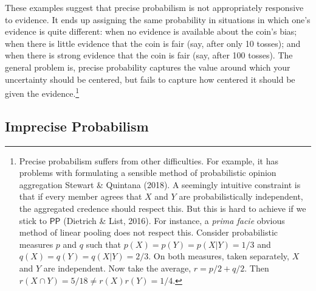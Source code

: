 \documentclass[
  10pt,
  dvipsnames,enabledeprecatedfontcommands]{scrartcl}
\newcommand{\s}[1]{\mbox{$\mathsf{#1}$}}
\begin{document}
These examples suggest that precise probabilism is not appropriately
responsive to evidence. It ends up assigning the same probability in
situations in which one's evidence is quite different: when no evidence
is available about the coin's bias; when there is little evidence that
the coin is fair (say, after only 10 tosses); and when there is strong
evidence that the coin is fair (say, after 100 tosses). The general
problem is, precise probability captures the value around which your
uncertainty should be centered, but fails to capture how centered it
should be given the evidence.\footnote{Precise probabilism suffers from
  other difficulties. For example, it has problems with formulating a
  sensible method of probabilistic opinion aggregation Stewart \&
  Quintana (2018). A seemingly intuitive constraint is that if every
  member agrees that \(X\) and \(Y\) are probabilistically independent,
  the aggregated credence should respect this. But this is hard to
  achieve if we stick to \s{PP} (Dietrich \& List, 2016). For instance,
  a \emph{prima facie} obvious method of linear pooling does not respect
  this. Consider probabilistic measures \(p\) and \(q\) such that
  \(p(X) = p(Y) = p(X\vert Y) = 1/3\) and
  \(q(X) = q(Y) = q(X\vert Y) = 2/3\). On both measures, taken
  separately, \(X\) and \(Y\) are independent. Now take the average,
  \(r=p/2+q/2\). Then \(r(X\cap Y) = 5/18 \neq r(X)r(Y)=1/4\).}

\hypertarget{imprecise-probabilism}{%
\subsection{Imprecise Probabilism}\label{imprecise-probabilism}}
\end{document}
